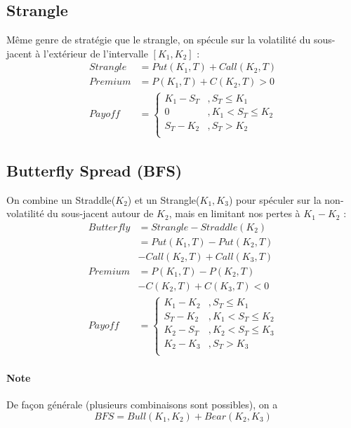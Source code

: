 \documentclass[10pt, french]{article}
\begin{document}
\begin{multicols*}{2}
\subsection*{Strangle}
Même genre de stratégie que le strangle, on spécule sur la volatilité du sous-jacent à l'extérieur de l'intervalle $[K_1, K_2]$ : 
\begin{align*}
Strangle			& = Put(K_1, T) + Call(K_2, T) \\
Premium			& = P(K_1, T) + C(K_2, T) > 0 \\
Payoff				& = 
\begin{cases}
K_1 - S_T			& , S_T \leq K_1 \\
0						& , K_1 < S_T \leq K_2 \\
S_T - K_2 		& , S_T > K_2 \\
\end{cases}
\end{align*}



\subsection*{Butterfly Spread (BFS)}
On combine un Straddle($K_2$) et un Strangle($K_1, K_3$) pour spéculer sur la non-volatilité du sous-jacent autour de $K_2$, mais en limitant nos pertes à $K_1 - K_2$ : 
\begin{align*}
Butterfly  & = Strangle - Straddle(K_2) \\
& = Put(K_1, T) - Put(K_2, T) \\
& - Call(K_2, T) + Call(K_3,T) \\
Premium	& = P(K_1, T) - P(K_2, T) \\
& - C(K_2, T) + C(K_3, T) < 0\\
Payoff		& = 
\begin{cases}
K_1 - K_2			& , S_T \leq K_1 \\
S_T - K_2			& , K_1 < S_T \leq K_2 \\
K_2 - S_T			& , K_2 < S_T \leq K_3 \\
K_2 - K_3			& , S_T > K_3 \\
\end{cases}
\end{align*}
\paragraph{Note} De façon générale (plusieurs combinaisons sont possibles), on a 
\[BFS = Bull(K_1, K_2) + Bear(K_2, K_3) \]



\end{multicols*}
\end{document}

